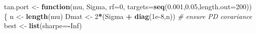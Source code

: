 \documentclass[
  12pt,
]{article}
\newenvironment{Shaded}{\begin{snugshade}}{\end{snugshade}}
\newcommand{\AttributeTok}[1]{\textcolor[rgb]{0.13,0.29,0.53}{#1}}
\newcommand{\CommentTok}[1]{\textcolor[rgb]{0.56,0.35,0.01}{\textit{#1}}}
\newcommand{\ConstantTok}[1]{\textcolor[rgb]{0.56,0.35,0.01}{#1}}
\newcommand{\ControlFlowTok}[1]{\textcolor[rgb]{0.13,0.29,0.53}{\textbf{#1}}}
\newcommand{\DecValTok}[1]{\textcolor[rgb]{0.00,0.00,0.81}{#1}}
\newcommand{\FloatTok}[1]{\textcolor[rgb]{0.00,0.00,0.81}{#1}}
\newcommand{\FunctionTok}[1]{\textcolor[rgb]{0.13,0.29,0.53}{\textbf{#1}}}
\newcommand{\NormalTok}[1]{#1}
\newcommand{\OtherTok}[1]{\textcolor[rgb]{0.56,0.35,0.01}{#1}}
\newcommand{\SpecialCharTok}[1]{\textcolor[rgb]{0.81,0.36,0.00}{\textbf{#1}}}
\begin{document}
\begin{Shaded}
\begin{Highlighting}[]
\NormalTok{tan.port }\OtherTok{\textless{}{-}} \ControlFlowTok{function}\NormalTok{(mu, Sigma, }\AttributeTok{rf=}\DecValTok{0}\NormalTok{, }\AttributeTok{targets=}\FunctionTok{seq}\NormalTok{(}\FloatTok{0.001}\NormalTok{,}\FloatTok{0.05}\NormalTok{,}\AttributeTok{length.out=}\DecValTok{200}\NormalTok{))\{}
\NormalTok{  n }\OtherTok{\textless{}{-}} \FunctionTok{length}\NormalTok{(mu)}
\NormalTok{  Dmat }\OtherTok{\textless{}{-}} \DecValTok{2}\SpecialCharTok{*}\NormalTok{(Sigma }\SpecialCharTok{+} \FunctionTok{diag}\NormalTok{(}\FloatTok{1e{-}8}\NormalTok{,n))  }\CommentTok{\# ensure PD covariance}
\NormalTok{  best }\OtherTok{\textless{}{-}} \FunctionTok{list}\NormalTok{(}\AttributeTok{sharpe=}\SpecialCharTok{{-}}\ConstantTok{Inf}\NormalTok{)}
  

\end{Highlighting}
\end{Shaded}
\end{document}
